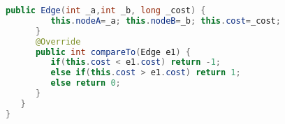 \begin{lstlisting}[language=Java]
      public Edge(int _a,int _b, long _cost) {
         this.nodeA=_a; this.nodeB=_b; this.cost=_cost;
      }
      @Override
      public int compareTo(Edge e1) {
         if(this.cost < e1.cost) return -1;
         else if(this.cost > e1.cost) return 1;
         else return 0;
      }
   }
}
\end{lstlisting} 